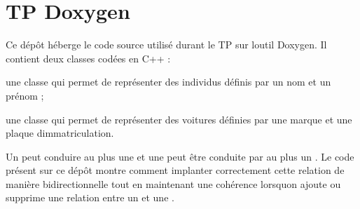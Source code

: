 \chapter{TP Doxygen}
\hypertarget{md__r_e_a_d_m_e}{}\label{md__r_e_a_d_m_e}
\label{md__r_e_a_d_m_e_autotoc_md0}%
%
 Ce dépôt héberge le code source utilisé durant le TP sur l\textquotesingle{}outil Doxygen. Il contient deux classes codées en C++ \+:


\begin{DoxyItemize}
\item une classe  qui permet de représenter des individus définis par un nom et un prénom ;
\item une classe  qui permet de représenter des voitures définies par une marque et une plaque d\textquotesingle{}immatriculation.
\end{DoxyItemize}

Un  peut conduire au plus une  et une  peut être conduite par au plus un . Le code présent sur ce dépôt montre comment implanter correctement cette relation de manière bidirectionnelle tout en maintenant une cohérence lorsqu\textquotesingle{}on ajoute ou supprime une relation entre un  et une . 